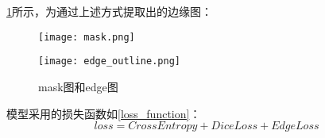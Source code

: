 \documentclass[AutoFakeBold]{LZUThesis}
\begin{document}



\cref{mask_edge_ans}所示，为通过上述方式提取出的边缘图：

\begin{figure}[htbp]
    \centering
    \begin{minipage}[t]{0.4\linewidth}  %
        \centering
        \texttt{[image: mask.png]}
    \end{minipage}
    \hfill%
    \begin{minipage}[t]{0.5\linewidth}
        \centering
        \texttt{[image: edge\_outline.png]}
    \end{minipage}
    \caption{mask图和edge图}
    \label{mask_edge_ans}
\end{figure}
模型采用的损失函数如\cref{loss_function}：
\begin{equation}
    loss=CrossEntropy+DiceLoss+EdgeLoss
    \label{loss_function}
\end{equation}
\end{document}
